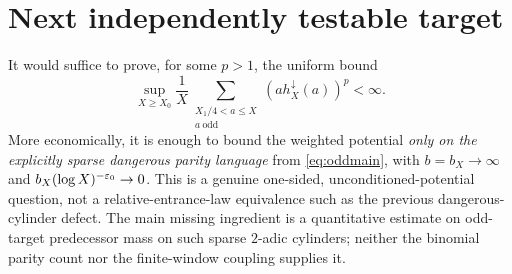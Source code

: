 \section{Next independently testable target}
It would suffice to prove, for some $p>1$, the uniform bound
\[
 \sup_{X\ge X_0}\frac1X
 \sum_{\substack{X_1/4<a\le X\\a\ \mathrm{odd}}}
 (a h_X^{\downarrow}(a))^p<\infty.
\]
More economically, it is enough to bound the weighted potential
\emph{only on the explicitly sparse dangerous parity language}
from \eqref{eq:oddmain}, with $b=b_X\to\infty$ and
$b_X(\log X)^{-\varepsilon_0}\to0$.  This is a genuine one-sided,
unconditioned-potential question, not a relative-entrance-law
equivalence such as the previous dangerous-cylinder defect.
The main missing ingredient is a quantitative estimate on odd-target
predecessor mass on such sparse $2$-adic cylinders; neither the
binomial parity count nor the finite-window coupling supplies it.

